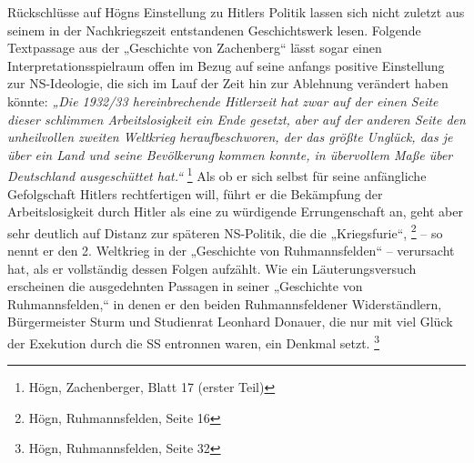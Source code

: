 \documentclass[a4paper]{article}
\begin{document}
Rückschlüsse auf Högns Einstellung zu Hitlers Politik lassen sich nicht
zuletzt aus seinem in der Nachkriegszeit entstandenen Geschichtswerk
lesen. Folgende Textpassage aus der „Geschichte von Zachenberg“ lässt
sogar einen Interpretationsspielraum offen im Bezug auf seine anfangs
positive Einstellung zur NS-Ideologie, die sich im Lauf der Zeit hin
zur Ablehnung verändert haben könnte: \textit{„Die 1932/33
hereinbrechende Hitlerzeit hat zwar auf der einen Seite dieser
schlimmen Arbeitslosigkeit ein Ende gesetzt, aber auf der anderen Seite
den unheilvollen zweiten Weltkrieg heraufbeschworen, der das größte
Unglück, das je über ein Land und seine Bevölkerung kommen konnte, in
übervollem Maße über Deutschland ausgeschüttet hat.“ } \footnote{Högn,
Zachenberger, Blatt 17 (erster Teil)}\textit{ }Als ob er sich selbst
für seine anfängliche Gefolgschaft Hitlers rechtfertigen will, führt er
die Bekämpfung der Arbeitslosigkeit durch Hitler als eine zu würdigende
Errungenschaft an, geht aber sehr deutlich auf Distanz zur späteren
NS-Politik, die die „Kriegsfurie“, \footnote{Högn, Ruhmannsfelden,
Seite 16} – so nennt er den 2. Weltkrieg in der „Geschichte von
Ruhmannsfelden“ – verursacht hat, als er vollständig dessen Folgen
aufzählt. Wie ein Läuterungsversuch erscheinen die ausgedehnten
Passagen in seiner „Geschichte von Ruhmannsfelden,“ in denen er den
beiden Ruhmannsfeldener Widerständlern, Bürgermeister Sturm und
Studienrat Leonhard Donauer, die nur mit viel Glück der Exekution durch
die SS entronnen waren, ein Denkmal setzt. \footnote{Högn,
Ruhmannsfelden, Seite 32}
\end{document}
